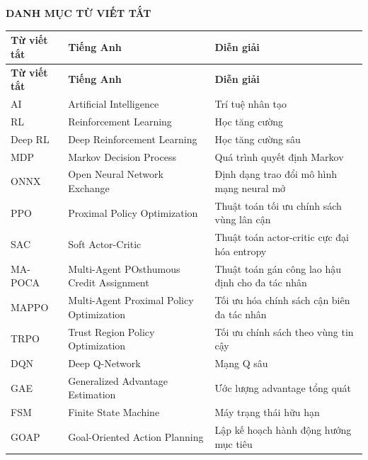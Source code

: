 {}
\begin{center}
    {\large\bfseries DANH MỤC TỪ VIẾT TẮT}
\end{center}

\vspace{0.5cm}

\begingroup
\tablefont
\renewcommand{\arraystretch}{1.4}
\noindent
\begin{longtable}{|>{\centering\arraybackslash}p{2.4cm}|p{4.5cm}|p{6.7cm}|}
\hline
\textbf{Từ viết tắt} & \textbf{Tiếng Anh} & \textbf{Diễn giải} \\
\hline
\endfirsthead
\hline
\textbf{Từ viết tắt} & \textbf{Tiếng Anh} & \textbf{Diễn giải} \\
\hline
\endhead
\hline
\endfoot
AI      & Artificial Intelligence & Trí tuệ nhân tạo \\ \hline
RL      & Reinforcement Learning & Học tăng cường \\ \hline
Deep RL & Deep Reinforcement Learning & Học tăng cường sâu \\ \hline
MDP     & Markov Decision Process & Quá trình quyết định Markov \\ \hline
ONNX    & Open Neural Network Exchange & Định dạng trao đổi mô hình mạng neural mở \\ \hline
PPO     & Proximal Policy Optimization & Thuật toán tối ưu chính sách vùng lân cận \\ \hline
SAC     & Soft Actor-Critic & Thuật toán actor-critic cực đại hóa entropy \\ \hline
MA-POCA & Multi-Agent POsthumous Credit Assignment & Thuật toán gán công lao hậu định cho đa tác nhân \\ \hline
MAPPO   & Multi-Agent Proximal Policy Optimization & Tối ưu hóa chính sách cận biên đa tác nhân \\ \hline
TRPO    & Trust Region Policy Optimization & Tối ưu chính sách theo vùng tin cậy \\ \hline
DQN     & Deep Q-Network & Mạng Q sâu \\ \hline
GAE     & Generalized Advantage Estimation & Ước lượng advantage tổng quát \\ \hline
FSM     & Finite State Machine & Máy trạng thái hữu hạn \\ \hline
GOAP    & Goal-Oriented Action Planning & Lập kế hoạch hành động hướng mục tiêu \\ \hline

\end{longtable}
